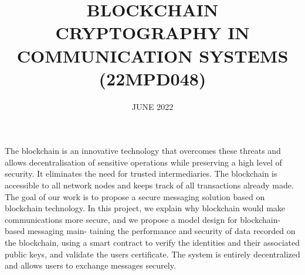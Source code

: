 \documentclass[BTech]{srmuthesis}
\begin{document}

\title{BLOCKCHAIN CRYPTOGRAPHY IN COMMUNICATION SYSTEMS (22MPD048)} %

\firstauthorregno{[Reg No: RA1811003030185]}
\secondauthorregno{[Reg No: RA18110030390202]}
\thirdauthorregno{[Reg No: RA1811003030204]}
\fourthauthorregno{[Reg No: RA1811003030237]}
\fifthauthor{}
\fifthauthorregno{}
\date{JUNE 2022} %

\maketitle
\certificate





\abstract
\begin{doublespacing}
  The blockchain is an innovative technology that overcomes these threats and allows decentralisation of sensitive operations while preserving a high level of security. It eliminates the need for trusted intermediaries. The blockchain is accessible to all network nodes and keeps track of all transactions already made. The goal of our work is to propose a secure messaging solution based on blockchain technology. In this project, we explain why blockchain would make communications more secure, and we propose a model design for blockchain-based messaging main- taining the performance and security of data recorded on the blockchain, using a smart contract to verify the identities and their associated public keys, and validate the users certificate. The system is entirely decentralized and allows users to exchange messages securely.
\end{doublespacing}
\end{document}
